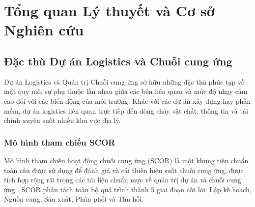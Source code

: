 \chapter{Tổng quan Lý thuyết và Cơ sở Nghiên cứu}

\section{Đặc thù Dự án Logistics và Chuỗi cung ứng}
Dự án Logistics và Quản trị Chuỗi cung ứng sở hữu những đặc thù phức tạp về mặt quy mô, sự phụ thuộc lẫn nhau giữa các bên liên quan và mức độ nhạy cảm cao đối với các biến động của môi trường. Khác với các dự án xây dựng hay phần mềm, dự án logistics liên quan trực tiếp đến dòng chảy vật chất, thông tin và tài chính xuyên suốt nhiều khu vực địa lý.

\subsection{Mô hình tham chiếu SCOR}
Mô hình tham chiếu hoạt động chuỗi cung ứng (SCOR) là một khung tiêu chuẩn toàn cầu được sử dụng để đánh giá và cải thiện hiệu suất chuỗi cung ứng, được tích hợp rộng rãi trong các tài liệu chuẩn mực về quản trị dự án \cite{pmbok2017} và chuỗi cung ứng \cite{christopher2016}. SCOR phân tách toàn bộ quá trình thành 5 giai đoạn cốt lõi: Lập kế hoạch, Nguồn cung, Sản xuất, Phân phối và Thu hồi.

